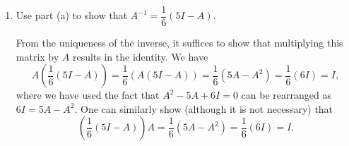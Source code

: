 \documentclass[letterpaper,12pt,reqno]{amsart}
\begin{document}
\begin{enumerate}
\begin{enumerate}
\bigskip

 \item Use part (a) to show that $A^{-1} = \dfrac{1}{6}(5I-A)$.

\bigskip

From the uniqueness of the inverse, it suffices to show that multiplying this matrix by $A$ results in the identity. We have
\[
 A\left(\frac{1}{6}(5I-A)\right) = \frac{1}{6}(A(5I-A)) = \frac{1}{6}(5A-A^2) = \frac{1}{6}(6I) = I,
\]
where we have used the fact that $A^2-5A+6I=0$ can be rearranged as $6I=5A-A^2$. One can similarly show (although it is not necessary) that
\[
 \left(\frac{1}{6}(5I-A)\right)A = \frac{1}{6}(5A-A^2) = \frac{1}{6}(6I) = I.
\]

\end{enumerate}
\end{enumerate}
\end{document}

